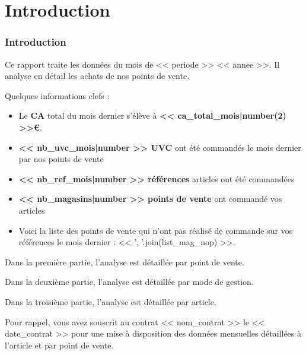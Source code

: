 \section{Introduction}

\begin{frame}
    \tiny
    \frametitle{Introduction}
    Ce rapport traite les données du mois de << periode >> << annee >>. Il analyse en détail les achats de nos points de vente.\par

    Quelques informations clefs :

    \begin{itemize}
        \item{Le \textbf{CA} total du mois dernier s’élève à \textbf{<< ca_total_mois|number(2) >>€}.}
        \item{\textbf{<< nb_uvc_mois|number >> UVC} ont été commandés le mois dernier par nos points de vente}
        \item{\textbf{<< nb_ref_mois|number >> références} articles ont été commandées}
        \item{\textbf{<< nb_magasins|number >> points de vente} ont commandé vos articles}
        \item{Voici la liste des points de vente qui n’ont pas réalisé de commande sur vos références le mois dernier : << ', '.join(list_mag_nop) >>.}
    \end{itemize}

    Dans la première partie, l’analyse est détaillée par point de vente.\par
    Dans la deuxième partie, l’analyse est détaillée par mode de gestion.\par
    Dans la troisième partie, l’analyse est détaillée par article.\par
    Pour rappel, vous avez souscrit au contrat << nom_contrat >> le << date_contrat >> pour une mise à disposition des données mensuelles détaillées à l’article et par point de vente.\par
\end{frame}
